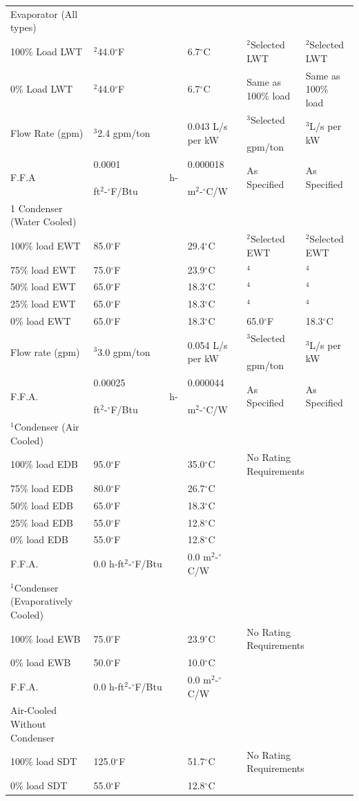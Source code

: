 \begin{longtable}[c]{p{1.2in}p{1.2in}p{1.2in}p{1.2in}p{1.2in}}
Evaporator (All types) & & & & \tabularnewline
100\% Load LWT & \(^{2}\)44.0\(^{\circ}\)F & 6.7\(^{\circ}\)C & \(^{2}\)Selected LWT & \(^{2}\)Selected LWT \tabularnewline
0\% Load LWT & \(^{2}\)44.0\(^{\circ}\)F & 6.7\(^{\circ}\)C & Same as 100\% load & Same as 100\% load \tabularnewline
Flow Rate (gpm) & \(^{3}\)2.4 gpm/ton & 0.043 L/s per kW & \(^{3}\)Selected ~~~~~~~~ gpm/ton & \(^{3}\)L/s per kW \tabularnewline
F.F.A & 0.0001 ~~~~~~~~~~~~~~~ h-ft\(^{2}\)-\(^{\circ}\)F/Btu & 0.000018 ~~~~~~~~ m\(^{2}\)-\(^{\circ}\)C/W & As Specified & As Specified \tabularnewline
\midrule
1 Condenser (Water  Cooled) & & & & \tabularnewline
100\% load EWT & 85.0\(^{\circ}\)F & 29.4\(^{\circ}\)C & \(^{2}\)Selected EWT & \(^{2}\)Selected EWT \tabularnewline
75\% load EWT & 75.0\(^{\circ}\)F & 23.9\(^{\circ}\)C & \(^{4}\) & \(^{4}\) \tabularnewline
50\% load EWT & 65.0\(^{\circ}\)F & 18.3\(^{\circ}\)C & \(^{4}\) & \(^{4}\) \tabularnewline
25\% load EWT & 65.0\(^{\circ}\)F & 18.3\(^{\circ}\)C & \(^{4}\) & \(^{4}\) \tabularnewline
0\% load EWT & 65.0\(^{\circ}\)F & 18.3\(^{\circ}\)C & 65.0\(^{\circ}\)F & 18.3\(^{\circ}\)C \tabularnewline
Flow rate (gpm) & \(^{3}\)3.0 gpm/ton & 0.054 L/s per kW & \(^{3}\)Selected ~~~~~~~~ gpm/ton & \(^{3}\)L/s per kW \tabularnewline
F.F.A. & 0.00025 ~~~~~~~~~~~~~~~ h-ft\(^{2}\)-\(^{\circ}\)F/Btu & 0.000044 ~~~~~~~~ m\(^{2}\)-\(^{\circ}\)C/W & As Specified & As Specified \tabularnewline
\midrule
\(^{1}\)Condenser (Air Cooled) & & & & \tabularnewline
100\% load EDB & 95.0\(^{\circ}\)F & 35.0\(^{\circ}\)C & \multicolumn{2}{l}{No Rating Requirements} \tabularnewline
75\% load EDB & 80.0\(^{\circ}\)F & 26.7\(^{\circ}\)C & & \tabularnewline
50\% load EDB & 65.0\(^{\circ}\)F & 18.3\(^{\circ}\)C & & \tabularnewline
25\% load EDB & 55.0\(^{\circ}\)F & 12.8\(^{\circ}\)C & & \tabularnewline
0\% load EDB & 55.0\(^{\circ}\)F & 12.8\(^{\circ}\)C & & \tabularnewline
F.F.A. & 0.0 h-ft\(^{2}\)-\(^{\circ}\)F/Btu & 0.0 m\(^{2}\)-\(^{\circ}\)C/W & & \tabularnewline
\midrule
\(^{1}\)Condenser (Evaporatively Cooled) & & & & \tabularnewline
100\% load EWB & 75.0\(^{\circ}\)F & 23.9\(^{\circ}\)C & \multicolumn{2}{l}{No Rating Requirements} \tabularnewline
0\% load EWB & 50.0\(^{\circ}\)F & 10.0\(^{\circ}\)C & & \tabularnewline
F.F.A. & 0.0 h-ft\(^{2}\)-\(^{\circ}\)F/Btu & 0.0 m\(^{2}\)-\(^{\circ}\)C/W & & \tabularnewline
\midrule
Air-Cooled Without  Condenser & & & & \tabularnewline
100\% load SDT & 125.0\(^{\circ}\)F & 51.7\(^{\circ}\)C & \multicolumn{2}{l}{No Rating Requirements} \tabularnewline
0\% load SDT & 55.0\(^{\circ}\)F & 12.8\(^{\circ}\)C & & \tabularnewline

\end{longtable}
